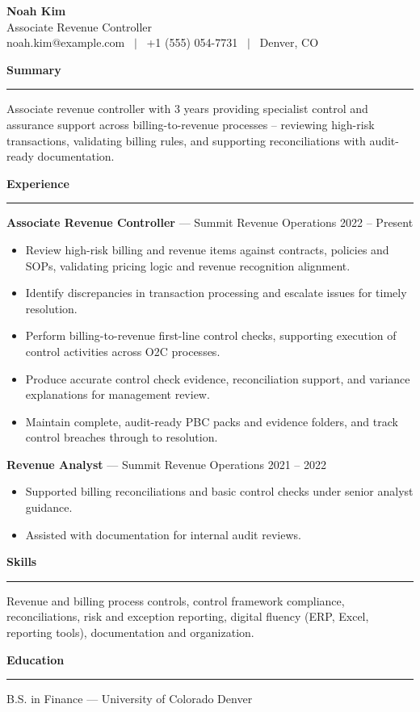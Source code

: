 \documentclass[11pt]{article}
\newcommand{\rsection}[1]{%
  \vspace{10pt}
  {\large\bfseries #1}\\[-4pt]
  \rule{\linewidth}{0.6pt}\vspace{4pt}
}
\begin{document}
\begin{center}
  {\Huge\bfseries Noah Kim}\\[4pt]
  Associate Revenue Controller \\
  noah.kim@example.com \ $\vert$ \ +1 (555) 054-7731 \ $\vert$ \ Denver, CO
\end{center}

\rsection{Summary}
Associate revenue controller with 3 years providing specialist control and assurance support across billing-to-revenue processes -- reviewing high-risk transactions, validating billing rules, and supporting reconciliations with audit-ready documentation.

\rsection{Experience}
\textbf{Associate Revenue Controller} --- Summit Revenue Operations \hfill 2022 -- Present
\begin{itemize}
  \item Review high-risk billing and revenue items against contracts, policies and SOPs, validating pricing logic and revenue recognition alignment.
  \item Identify discrepancies in transaction processing and escalate issues for timely resolution.
  \item Perform billing-to-revenue first-line control checks, supporting execution of control activities across O2C processes.
  \item Produce accurate control check evidence, reconciliation support, and variance explanations for management review.
  \item Maintain complete, audit-ready PBC packs and evidence folders, and track control breaches through to resolution.
\end{itemize}

\textbf{Revenue Analyst} --- Summit Revenue Operations \hfill 2021 -- 2022
\begin{itemize}
  \item Supported billing reconciliations and basic control checks under senior analyst guidance.
  \item Assisted with documentation for internal audit reviews.
\end{itemize}

\rsection{Skills}
Revenue and billing process controls, control framework compliance, reconciliations, risk and exception reporting, digital fluency (ERP, Excel, reporting tools), documentation and organization.

\rsection{Education}
B.S. in Finance --- University of Colorado Denver
\end{document}
